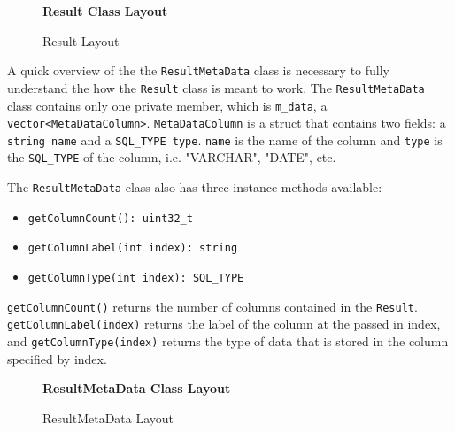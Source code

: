 \documentclass[letterpaper, 12pt]{article}
\begin{document}
  \begin{figure}
    \centering
    \textbf{Result Class Layout}
    \caption{Result Layout}
  \end{figure}
  \par\vspace{\baselineskip}
  A quick overview of the the \lstinline|ResultMetaData| class
  is necessary to fully understand the how the
  \lstinline|Result| class is meant to work.
  The \lstinline|ResultMetaData| class contains only one
  private member, which is
  \lstinline|m_data|, a
  \lstinline|vector<MetaDataColumn>|.
  \lstinline|MetaDataColumn| is a struct that contains two fields:
  a \lstinline|string name| and a
  \lstinline|SQL_TYPE type|. \lstinline|name|
  is the name of the column and \lstinline|type| is the
  \lstinline|SQL_TYPE| of the column, i.e. "VARCHAR", "DATE", etc.
  \par\vspace{\baselineskip}
  The \lstinline|ResultMetaData| class also has
  three instance methods available:
  \begin{itemize}
    \item \lstinline|getColumnCount(): uint32_t|
    \item \lstinline|getColumnLabel(int index): string|
    \item \lstinline|getColumnType(int index): SQL_TYPE|
  \end{itemize}

  \lstinline|getColumnCount()| returns the number of
  columns contained in the \lstinline[basicstyle=\ttfamily]|Result|.
  \lstinline|getColumnLabel(index)| returns the label of the
  column at the passed in index, and
  \lstinline|getColumnType(index)| returns the type of data that
  is stored in the column specified by index.

  \begin{figure}
    \centering
    \textbf{ResultMetaData Class Layout}
    \caption{ResultMetaData Layout}
  \end{figure}

  \newpage
\end{document}
